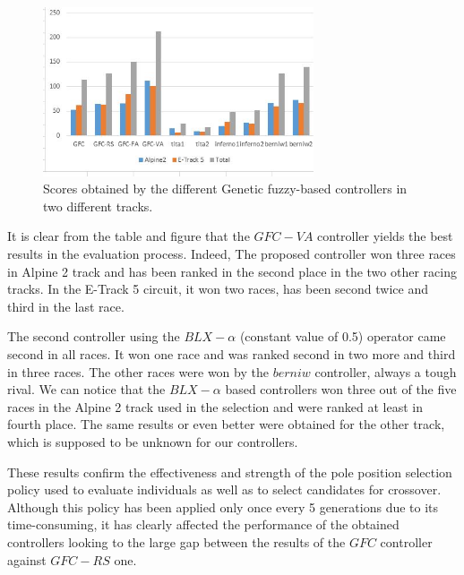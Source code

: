 \documentclass[conference]{IEEEtran}
\begin{document}
\begin{figure}[!ht]	
	\begin{center}
		\includegraphics[width=8cm]{fig/gfc_races.jpg}
		\caption{Scores obtained by the different Genetic fuzzy-based controllers in two different tracks.}
		\label{fig:gfc_races}
	\end{center}
\end{figure}
It is clear from the table and figure that the $GFC-VA$ controller
yields the best results in the evaluation process. Indeed, The
proposed controller won three races in Alpine 2 track and has been
ranked in the second place in the two other racing tracks. In the E-Track 5
circuit, it won two races, has been second twice and third in
the last race.

The second controller using the $BLX-\alpha$ (constant value of 0.5)
operator came second in all races. It won one race and was ranked
second in two more and third in three races.
The other races were won by the $berniw$ controller, always a tough rival.
We can notice that the $BLX-\alpha$ based controllers won three out of the five races in the Alpine 2 track used in the selection and were ranked at least in fourth place.
The same results or even  better were obtained for the other track, which is supposed to be unknown for our controllers.

These results confirm the effectiveness and strength of the pole position selection policy used to evaluate individuals as well as to select candidates for crossover. Although this policy has been applied only once every 5 generations due to its time-consuming, it has clearly affected the performance of the obtained controllers looking to the large gap between the results of the $GFC$ controller against $GFC-RS$ one.
\end{document}
